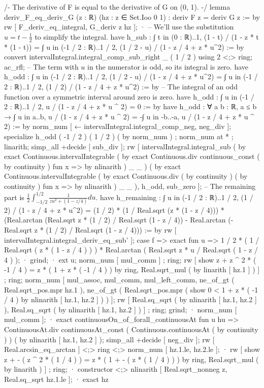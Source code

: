 /-
The derivative of F is equal to the derivative of G on (0, 1).
-/
lemma deriv_F_eq_deriv_G (z : ℝ) (hz : z ∈ Set.Ioo 0 1) : deriv F z = deriv G z := by
  rw [ F_deriv_eq_integral, G_deriv z hz ];
  · -- We'll use the substitution $u = t - \frac{1}{2}$ to simplify the integral.
    have h_sub : ∫ t in (0 : ℝ)..1, (1 - t) / (1 - z * t * (1 - t)) = ∫ u in (-1 / 2 : ℝ)..1 / 2, (1 / 2 - u) / (1 - z / 4 + z * u^2) := by
      convert intervalIntegral.integral_comp_sub_right _ ( 1 / 2 ) using 2 <;> ring;
      ac_rfl;
    -- The term with $u$ in the numerator is odd, so its integral is zero.
    have h_odd : ∫ u in (-1 / 2 : ℝ)..1 / 2, (1 / 2 - u) / (1 - z / 4 + z * u^2) = ∫ u in (-1 / 2 : ℝ)..1 / 2, (1 / 2) / (1 - z / 4 + z * u^2) := by
      -- The integral of an odd function over a symmetric interval around zero is zero.
      have h_odd : ∫ u in (-1 / 2 : ℝ)..1 / 2, u / (1 - z / 4 + z * u ^ 2) = 0 := by
        have h_odd : ∀ a b : ℝ, a ≤ b → ∫ u in a..b, u / (1 - z / 4 + z * u ^ 2) = -∫ u in -b..-a, u / (1 - z / 4 + z * u ^ 2) := by
          norm_num [ ← intervalIntegral.integral_comp_neg, neg_div ];
        specialize h_odd ( -1 / 2 ) ( 1 / 2 ) ( by norm_num ) ; norm_num at * ; linarith;
      simp_all +decide [ sub_div ];
      rw [ intervalIntegral.integral_sub ( by exact Continuous.intervalIntegrable ( by exact Continuous.div continuous_const ( by continuity ) fun x => by nlinarith ) _ _ ) ( by exact Continuous.intervalIntegrable ( by exact Continuous.div ( by continuity ) ( by continuity ) fun x => by nlinarith ) _ _ ), h_odd, sub_zero ];
    -- The remaining part is $\frac{1}{2} \int_{-1/2}^{1/2} \frac{1}{z u^2 + (1-z/4)} du$.
    have h_remaining : ∫ u in (-1 / 2 : ℝ)..1 / 2, (1 / 2) / (1 - z / 4 + z * u^2) = (1 / 2) * (1 / Real.sqrt (z * (1 - z / 4))) * (Real.arctan (Real.sqrt z * (1 / 2) / Real.sqrt (1 - z / 4)) - Real.arctan (-Real.sqrt z * (1 / 2) / Real.sqrt (1 - z / 4))) := by
      rw [ intervalIntegral.integral_deriv_eq_sub' ];
      case f => exact fun u => 1 / 2 * ( 1 / Real.sqrt ( z * ( 1 - z / 4 ) ) ) * Real.arctan ( Real.sqrt z * u / Real.sqrt ( 1 - z / 4 ) );
      · grind;
      · ext u; norm_num [ mul_comm ] ; ring;
        rw [ show z + z ^ 2 * ( -1 / 4 ) = z * ( 1 + z * ( -1 / 4 ) ) by ring, Real.sqrt_mul ( by linarith [ hz.1 ] ) ] ; ring;
        norm_num [ mul_assoc, mul_comm, mul_left_comm, ne_of_gt ( Real.sqrt_pos.mpr hz.1 ), ne_of_gt ( Real.sqrt_pos.mpr ( show 0 < 1 + z * ( -1 / 4 ) by nlinarith [ hz.1, hz.2 ] ) ) ];
        rw [ Real.sq_sqrt ( by nlinarith [ hz.1, hz.2 ] ), Real.sq_sqrt ( by nlinarith [ hz.1, hz.2 ] ) ] ; ring;
        grind;
      · norm_num [ mul_comm ];
      · exact continuousOn_of_forall_continuousAt fun u hu => ContinuousAt.div continuousAt_const ( Continuous.continuousAt ( by continuity ) ) ( by nlinarith [ hz.1, hz.2 ] );
    simp_all +decide [ neg_div ];
    rw [ Real.arcsin_eq_arctan ] <;> ring <;> norm_num [ hz.1.le, hz.2.le ];
    · rw [ show z + - ( z ^ 2 * ( 1 / 4 ) ) = z * ( 1 + - ( z * ( 1 / 4 ) ) ) by ring, Real.sqrt_mul ( by linarith ) ] ; ring;
    · constructor <;> nlinarith [ Real.sqrt_nonneg z, Real.sq_sqrt hz.1.le ];
  · exact hz

